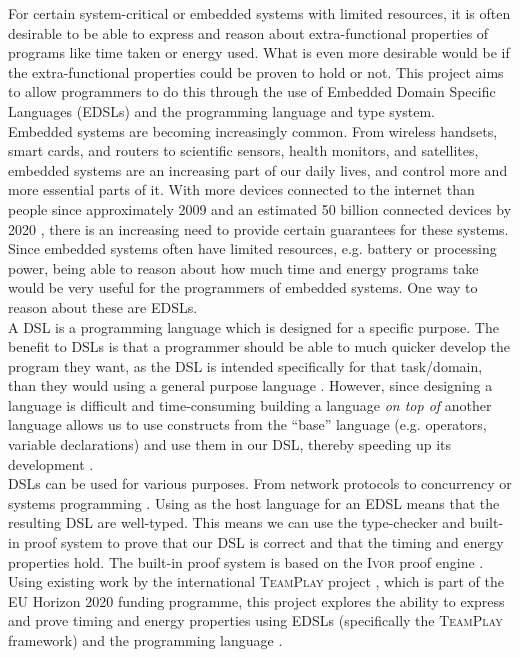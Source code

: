 For certain system-critical or embedded systems with limited resources, it is often desirable to be able to express and reason about extra-functional properties of programs like time taken or energy used. What is even more desirable would be if the extra-functional properties could be proven to hold or not. This project aims to allow programmers to do this through the use of Embedded Domain Specific Languages (EDSLs) and the \Idris programming language and type system.
\\

Embedded systems are becoming increasingly common. From wireless handsets, smart cards, and routers to scientific sensors, health monitors, and satellites, embedded systems are an increasing part of our daily lives, and control more and more essential parts of it. With more devices connected to the internet than people since approximately 2009 and an estimated 50 billion connected devices by 2020 \cite{cisco-whitepaper}, there is an increasing need to provide certain guarantees for these systems. Since embedded systems often have limited resources, e.g. battery or processing power, being able to reason about how much time and energy programs take would be very useful for the programmers of embedded systems. One way to reason about these are EDSLs.
\\

A DSL is a programming language which is designed for a specific purpose. The benefit to DSLs is that a programmer should be able to much quicker develop the program they want, as the DSL is intended specifically for that task/domain, than they would using a general purpose language \cite{685738}. However, since designing a language is difficult and time-consuming building a language \textit{on top of} another language allows us to use constructs from the ``base'' language (e.g. operators, variable declarations) and use them in our DSL, thereby speeding up its development \cite{hudak1996building}.
\\

DSLs can be used for various purposes. From network protocols \cite{5158855} to concurrency or systems programming \cite{brady2010correct,10.1007/978-3-642-27694-1_18}. Using \Idris as the host language for an EDSL means that the resulting DSL are well-typed. This means we can use the \Idris type-checker and built-in proof system to prove that our DSL is correct and that the timing and energy properties hold. The built-in proof system is based on the \textsc{Ivor} proof engine \cite{10.1007/978-3-540-74130-5_9,brady_2013}. Using existing work by the international \textsc{TeamPlay} project \cite{teamplay:d1.1}, which is part of the EU Horizon 2020 funding programme, this project explores the ability to express and prove timing and energy properties using EDSLs (specifically the \textsc{TeamPlay} framework) and the \Idris programming language \cite{brady_2013}.
\\

